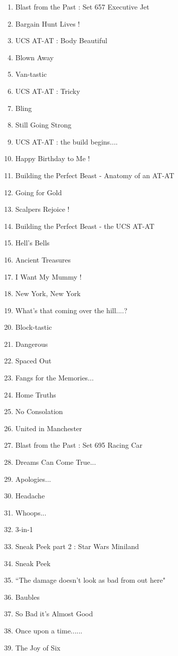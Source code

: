 \documentclass{article}
\begin{document}
\begin{enumerate}
\item Blast from the Past : Set 657 Executive Jet
\item Bargain Hunt Lives !
\item UCS AT-AT : Body Beautiful
\item Blown Away
\item Van-tastic
\item UCS AT-AT : Tricky
\item Bling
\item Still Going Strong
\item UCS AT-AT : the build begins....
\item Happy Birthday to Me !
\item Building the Perfect Beast - Anatomy of an AT-AT
\item Going for Gold
\item Scalpers Rejoice !
\item Building the Perfect Beast - the UCS AT-AT
\item Hell's Bells
\item Ancient Treasures
\item I Want My Mummy !
\item New York, New York
\item What's that coming over the hill....?
\item Block-tastic
\item Dangerous
\item Spaced Out
\item Fangs for the Memories...
\item Home Truths
\item No Consolation
\item United in Manchester
\item Blast from the Past : Set 695 Racing Car
\item Dreams Can Come True...
\item Apologies...
\item Headache
\item Whoops...
\item 3-in-1
\item Sneak Peek part 2 : Star Wars Miniland
\item Sneak Peek
\item ``The damage doesn't look as bad from out here"
\item Baubles
\item So Bad it's Almost Good
\item Once upon a time......
\item The Joy of Six

\end{enumerate}
\end{document}
